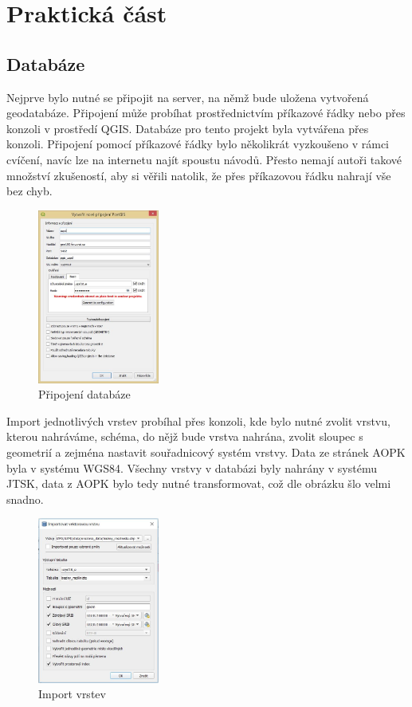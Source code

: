\documentclass[a4paper, 12pt]{article}
\begin{document}
\clearpage

\section{Praktická část}
\subsection{Databáze}
Nejprve bylo nutné se připojit na server, na němž bude uložena vytvořená geodatabáze. Připojení může probíhat prostřednictvím příkazové řádky nebo přes konzoli v prostředí QGIS. Databáze pro tento projekt byla vytvářena přes konzoli. Připojení pomocí příkazové řádky bylo několikrát vyzkoušeno v rámci cvíčení, navíc lze na internetu najít spoustu návodů. Přesto nemají autoři takové množství zkušeností, aby si věřili natolik, že přes příkazovou řádku nahrají vše bez chyb. 

\begin{figure}[h!]
	\centering
	\includegraphics[width=4cm]{pictures/pripojeni.jpg}
	\caption{Připojení databáze}
\end{figure}

Import jednotlivých vrstev probíhal přes konzoli, kde bylo nutné zvolit vrstvu, kterou nahráváme, schéma, do nějž bude vrstva nahrána, zvolit sloupec s geometrií a zejména nastavit souřadnicový systém vrstvy. Data ze stránek AOPK byla v systému WGS84. Všechny vrstvy v databázi byly nahrány v systému JTSK, data z AOPK bylo tedy nutné transformovat, což dle obrázku šlo velmi snadno.


\begin{figure}[h!]
	\centering
	\includegraphics[width=4cm]{pictures/import.jpg}
	\caption{Import vrstev}
\end{figure}
\end{document}
